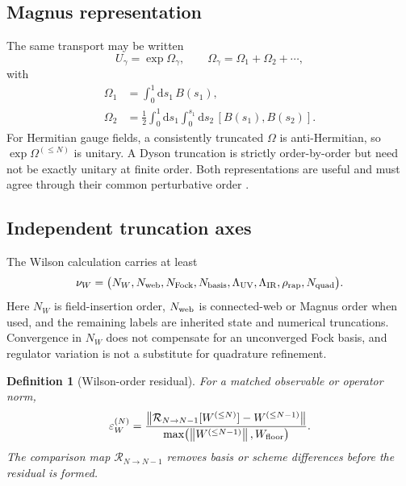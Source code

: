 \documentclass[11pt]{article}
\newtheorem{definition}{Definition}[section]
\newcommand{\dd}{\mathrm{d}}
\newcommand{\cR}{\mathcal R}
\newcommand{\eps}{\varepsilon}
\newcommand{\norm}[1]{\left\lVert#1\right\rVert}
\newcommand{\rap}{\mathrm{rap}}
\newcommand{\UV}{\mathrm{UV}}
\newcommand{\IR}{\mathrm{IR}}
\begin{document}
\subsection{Magnus representation}

The same transport may be written
\begin{equation}
 U_\gamma=\exp\Omega_\gamma,
 \qquad
 \Omega_\gamma=\Omega_1+\Omega_2+\cdots,
\label{eq:magnus-expansion}
\end{equation}
with
\begin{align}
 \Omega_1&=\int_0^1\dd s_1\,B(s_1),
\label{eq:magnus-1}\\
 \Omega_2&=\frac12\int_0^1\dd s_1\int_0^{s_1}\dd s_2\,
 [B(s_1),B(s_2)].
\label{eq:magnus-2}
\end{align}
For Hermitian gauge fields, a consistently truncated \(\Omega\) is
anti-Hermitian, so \(\exp\Omega^{(\le N)}\) is unitary.  A Dyson truncation is
strictly order-by-order but need not be exactly unitary at finite order.  Both
representations are useful and must agree through their common perturbative
order \cite{Magnus1954}.

\subsection{Independent truncation axes}

The Wilson calculation carries at least
\begin{equation}
 \nu_W=
 \bigl(N_W,N_{\rm web},N_{\rm Fock},N_{\rm basis},
 \Lambda_{\UV},\Lambda_{\IR},\rho_{\rap},N_{\rm quad}\bigr).
\label{eq:wilson-truncation-tuple}
\end{equation}
Here \(N_W\) is field-insertion order, \(N_{\rm web}\) is connected-web or
Magnus order when used, and the remaining labels are inherited state and
numerical truncations.  Convergence in \(N_W\) does not compensate for an
unconverged Fock basis, and regulator variation is not a substitute for
quadrature refinement.

\begin{definition}[Wilson-order residual]
\label{def:wilson-residual}
For a matched observable or operator norm,
\begin{equation}
 \eps_W^{(N)}
 =\frac{\norm{\cR_{N\to N-1}[W^{(\le N)}]-W^{(\le N-1)}}}
 {\max\!\left(\norm{W^{(\le N-1)}},W_{\rm floor}\right)}.
\label{eq:wilson-order-residual}
\end{equation}
The comparison map \(\cR_{N\to N-1}\) removes basis or scheme differences
before the residual is formed.
\end{definition}
\end{document}
